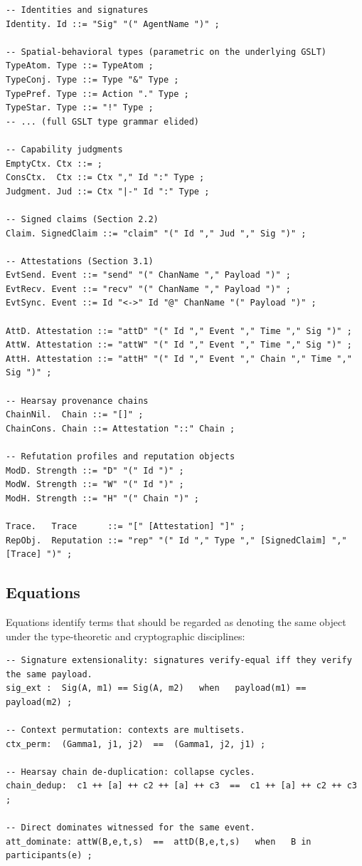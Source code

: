 \documentclass[11pt]{article}
\theoremstyle{definition}
\theoremstyle{plain}
\theoremstyle{remark}
\begin{document}
\begin{lstlisting}[language=rholang,caption={Reputation language grammar (BNFC-style)}]
-- Identities and signatures
Identity. Id ::= "Sig" "(" AgentName ")" ;

-- Spatial-behavioral types (parametric on the underlying GSLT)
TypeAtom. Type ::= TypeAtom ;
TypeConj. Type ::= Type "&" Type ;
TypePref. Type ::= Action "." Type ;
TypeStar. Type ::= "!" Type ;
-- ... (full GSLT type grammar elided)

-- Capability judgments
EmptyCtx. Ctx ::= ;
ConsCtx.  Ctx ::= Ctx "," Id ":" Type ;
Judgment. Jud ::= Ctx "|-" Id ":" Type ;

-- Signed claims (Section 2.2)
Claim. SignedClaim ::= "claim" "(" Id "," Jud "," Sig ")" ;

-- Attestations (Section 3.1)
EvtSend. Event ::= "send" "(" ChanName "," Payload ")" ;
EvtRecv. Event ::= "recv" "(" ChanName "," Payload ")" ;
EvtSync. Event ::= Id "<->" Id "@" ChanName "(" Payload ")" ;

AttD. Attestation ::= "attD" "(" Id "," Event "," Time "," Sig ")" ;
AttW. Attestation ::= "attW" "(" Id "," Event "," Time "," Sig ")" ;
AttH. Attestation ::= "attH" "(" Id "," Event "," Chain "," Time "," Sig ")" ;

-- Hearsay provenance chains
ChainNil.  Chain ::= "[]" ;
ChainCons. Chain ::= Attestation "::" Chain ;

-- Refutation profiles and reputation objects
ModD. Strength ::= "D" "(" Id ")" ;
ModW. Strength ::= "W" "(" Id ")" ;
ModH. Strength ::= "H" "(" Chain ")" ;

Trace.   Trace      ::= "[" [Attestation] "]" ;
RepObj.  Reputation ::= "rep" "(" Id "," Type "," [SignedClaim] "," [Trace] ")" ;
\end{lstlisting}

\subsection{Equations}

Equations identify terms that should be regarded as denoting the same object under the type-theoretic and cryptographic disciplines:

\begin{lstlisting}[language=rholang,caption={Equations on the grammar}]
-- Signature extensionality: signatures verify-equal iff they verify the same payload.
sig_ext :  Sig(A, m1) == Sig(A, m2)   when   payload(m1) == payload(m2) ;

-- Context permutation: contexts are multisets.
ctx_perm:  (Gamma1, j1, j2)  ==  (Gamma1, j2, j1) ;

-- Hearsay chain de-duplication: collapse cycles.
chain_dedup:  c1 ++ [a] ++ c2 ++ [a] ++ c3  ==  c1 ++ [a] ++ c2 ++ c3 ;

-- Direct dominates witnessed for the same event.
att_dominate: attW(B,e,t,s)  ==  attD(B,e,t,s)   when   B in participants(e) ;
\end{lstlisting}
\end{document}
